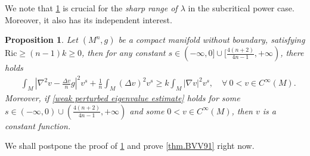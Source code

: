 \documentclass[12pt]{amsart}
\newtheorem{proposition}{Proposition}
\numberwithin{equation}{section}
\numberwithin{lemma}{section}
\numberwithin{proposition}{section}
\numberwithin{corollary}{section}
\numberwithin{remark}{section}
\begin{document}
We note that \cref{prop.weak perturbed eigenvalue estimate} is crucial for the \emph{sharp range of $\lambda$} in the subcritical power case. Moreover, it also has its independent interest.
\begin{proposition}\label{prop.weak perturbed eigenvalue estimate}
        Let $(M^n,g)$ be a compact manifold without boundary, satisfying $\mathrm{Ric}\geq (n-1)k\geq0$, then for any constant $s\in(-\infty,0]\cup [\frac{4(n+2)}{4n-1},+\infty)$, there holds 
        \begin{align}\label{weak perturbed eigenvalue estimate}
        &\int_M 
        \left|\nabla^2 v-\frac{\Delta v}{n}g\right|^2 v^{s}
        +\frac{1}{n}\int_M (\Delta v)^2v^{s}
        \geq k\int_M |\nabla v|^2v^{s},\quad \forall\  0<v\in C^{\infty}(M).
    \end{align}
    Moreover, if \cref{weak perturbed eigenvalue estimate} holds for some $s\in (-\infty,0)\cup (\frac{4(n+2)}{4n-1},+\infty)$ and some $0<v\in C^{\infty}(M)$, then $v$ is a constant function.
\end{proposition}
We shall postpone the proof of \cref{prop.weak perturbed eigenvalue estimate} and prove \cref{thm.BVV91} right now.
\end{document}
